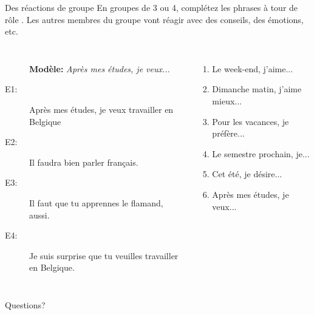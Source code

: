 \documentclass{beamer}
\begin{document}
  \begin{frame}{Des réactions de groupe}
    En groupes de 3 ou 4, complétez les phrases à tour de rôle .
    Les autres membres du groupe vont réagir avec des conseils, des émotions, etc.
    \begin{columns}
        \begin{description}
          \item[] \textbf{Modèle:} \emph{Après mes études, je veux...}
          \item[E1:] Après mes études, je veux travailler en Belgique
          \item[E2:] Il faudra bien parler français.
          \item[E3:] Il faut que tu apprennes le flamand, aussi.
          \item[E4:] Je suis surprise que tu veuilles travailler en Belgique.
        \end{description}
        \begin{enumerate}
          \item Le week-end, j'aime...
          \item Dimanche matin, j'aime mieux...
          \item Pour les vacances, je préfère...
          \item Le semestre prochain, je...
          \item Cet été, je désire...
          \item Après mes études, je veux...
        \end{enumerate}
    \end{columns}
  \end{frame}

  \begin{frame}{}
    \begin{center}
      \Large Questions?
    \end{center}
  \end{frame}
\end{document}
